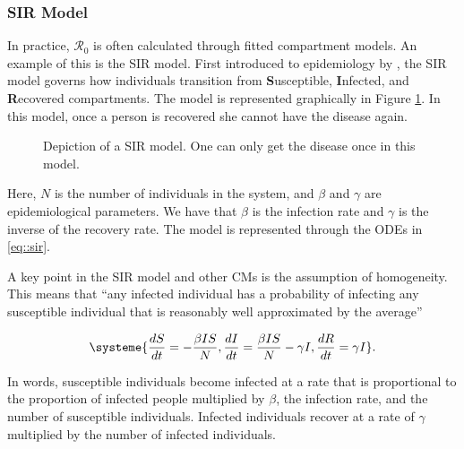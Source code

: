 \documentclass[12pt]{article}
\newcommand{\rr}{\ensuremath{\mathcal{R}_0}}
\begin{document}
\subsubsection{SIR Model}
\label{sec:sir-model}


In practice, $\rr$ is often calculated through fitted compartment models.  An example of this is the SIR model.  First introduced to epidemiology by  \cite{Kermack700}, the SIR model governs how individuals transition from \textbf{S}usceptible, \textbf{I}nfected, and \textbf{R}ecovered compartments.  The model is represented graphically in Figure \ref{fig::sir}.  In this model, once a person is recovered she cannot have the disease again.

\begin{figure}[h]
\centering
{}
\caption{Depiction of a SIR model.  One can only get the disease once in this model.}\label{fig::sir}
\end{figure}

Here, $N$ is the number of individuals in the system, and  $\beta$ and $\gamma$ are epidemiological parameters.  We have that $\beta$ is the infection rate and $\gamma$ is the inverse of the recovery rate.  The model is represented through the ODEs in \ref{eq::sir}.  

A key point in the SIR model and other CMs is the assumption of homogeneity.  This means that ``any infected individual has a probability of infecting any susceptible individual that is reasonably well approximated by the average'' \cite{jonesjh2007}


\begin{align}
\systeme{\frac{dS}{dt} = -\frac{\beta I S}{N}, \frac{dI}{dt} = \frac{\beta I S}{N} - \gamma I, \frac{dR}{dt} = \gamma I}. \label{eq::sir}
\end{align}

In words, susceptible individuals become infected at a rate that is proportional to the proportion of infected people multiplied by $\beta$, the infection rate, and the number of susceptible individuals.  Infected individuals recover at a rate of $\gamma$ multiplied by the number of infected individuals.
\end{document}
